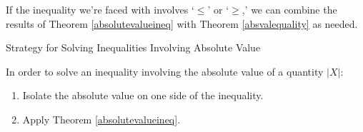 If the inequality we're faced with involves `$\leq$' or `$\geq$,' we can combine the results of Theorem \ref{absolutevalueineq}  with Theorem \ref{absvalequality} as needed. 

\begin{floatbox}[label=box:strategyforsolvingabsineq]{Strategy for Solving Inequalities Involving  Absolute Value}

In order to solve an inequality involving the absolute value of a quantity $|X|$:

\begin{enumerate}

\item  Isolate the absolute value on one side of the inequality.

\item  Apply Theorem \ref{absolutevalueineq}.

\end{enumerate}

\end{floatbox}

